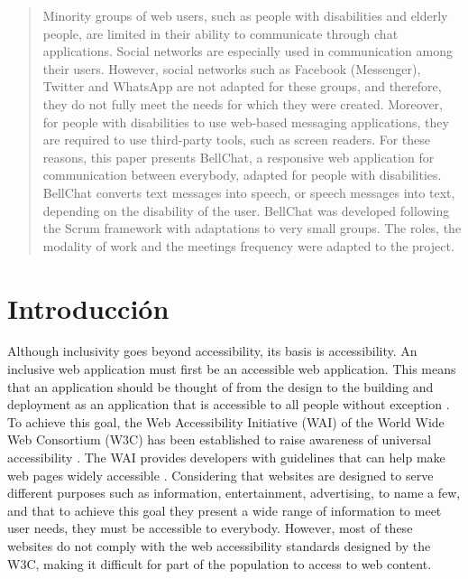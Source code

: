 \documentclass{svproc}
\begin{document}
\begin{abstract}
Minority groups of web users, such as people with disabilities and elderly people, are limited in their ability to communicate through chat applications. Social networks are especially used in communication among their users. However, social networks such as Facebook (Messenger), Twitter and WhatsApp are not adapted for these groups, and therefore, they do not fully meet the needs for which they were created. Moreover, for people with disabilities to use web-based messaging applications, they are required to use third-party tools, such as screen readers. For these reasons, this paper presents BellChat, a responsive web application for communication between everybody, adapted for people with disabilities. BellChat converts text messages into speech, or speech messages into text, depending on the disability of the user. BellChat was developed following the Scrum framework with adaptations to very small groups. The roles, the modality of work and the meetings frequency were adapted to the project.


\end{abstract}
%
\section{Introducción}
%
Although inclusivity goes beyond accessibility, its basis is accessibility. An inclusive web application must first be an accessible web application. This means that an application should be thought of from the design to the building and deployment as an application that is accessible to all people without exception \cite{WCAG202012}. To achieve this goal, the Web Accessibility Initiative (WAI) of the World Wide Web Consortium (W3C) has been established to raise awareness of universal accessibility \cite{W3C2022}. The WAI provides developers with guidelines that can help make web pages widely accessible \cite{Shawar2015}. Considering that websites are designed to serve different purposes such as information, entertainment, advertising, to name a few, and that to achieve this goal they present a wide range of information to meet user needs, they must be accessible to everybody. However, most of these websites do not comply with the web accessibility standards designed by the W3C, making it difficult for part of the population to access to web content\cite{Broccia2020}.
\end{document}
